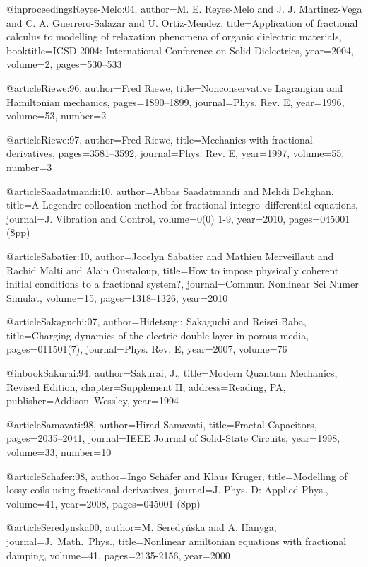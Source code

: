 \begin{thebibliography}{99}
@inproceedings{Reyes-Melo:04,
  author={M. E. Reyes-Melo and J. J. Martinez-Vega and C. A. Guerrero-Salazar and
    U. Ortiz-Mendez},
  title={Application of fractional calculus to modelling of relaxation phenomena
    of organic dielectric materials},
  booktitle={ICSD 2004: International Conference on Solid Dielectrics},
  year={2004},
  volume={2},
  pages={530--533}
}

@article{Riewe:96,
  author={Fred Riewe},
  title={Nonconservative {L}agrangian and {H}amiltonian mechanics},
  pages={1890--1899},
  journal={Phys. Rev. E},
  year={1996},
  volume={53},
  number={2}
}

@article{Riewe:97,
  author={Fred Riewe},
  title={Mechanics with fractional derivatives},
  pages={3581--3592},
  journal={Phys. Rev. E},
  year={1997},
  volume={55},
  number={3}
}

@article{Saadatmandi:10,
  author={Abbas Saadatmandi and Mehdi Dehghan},
  title={A Legendre collocation method for fractional integro--differential equations},
  journal={J. Vibration and Control},
  volume={0(0) 1-9},
  year={2010},
  pages={045001 (8pp)}
}

@article{Sabatier:10,
  author={Jocelyn Sabatier and Mathieu Merveillaut and Rachid Malti and Alain Oustaloup},
  title={How to impose physically coherent initial conditions to a fractional system?},
  journal={Commun Nonlinear Sci Numer Simulat},
  volume={15},
  pages={1318--1326},
  year={2010}
}

@article{Sakaguchi:07,
  author={Hidetsugu Sakaguchi and Reisei Baba},
  title={Charging dynamics of the electric double layer in porous media},
  pages={011501(7)},
  journal={Phys. Rev. E},
  year={2007},
  volume={76}
}

@inbook{Sakurai:94,
  author={Sakurai, J.},
  title={Modern Quantum Mechanics, Revised Edition},
  chapter={Supplement II},
  address={Reading, PA},
  publisher={Addison--Wessley},
  year={1994}
}

@article{Samavati:98,
  author={Hirad Samavati},
  title={Fractal Capacitors},
  pages={2035--2041},
  journal={IEEE Journal of Solid-State Circuits},
  year={1998},
  volume={33},
  number={10}
}

@article{Schafer:08,
  author={Ingo Sch\"{a}fer and Klaus Kr\"{u}ger},
  title={Modelling of lossy coils using fractional derivatives},
  journal={J. Phys. D: Applied Phys.},
  volume={41},
  year={2008},
  pages={045001 (8pp)}
}

@article{Seredynska00,
  author={M. Seredy{\'{n}}ska and A. Hanyga},
  journal={J.\ Math.\ Phys.},
  title={Nonlinear amiltonian equations with fractional damping},
  volume={41},
  pages={2135-2156},
  year={2000}
}


\end{thebibliography}
